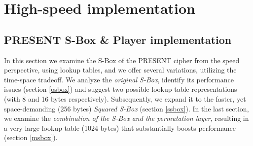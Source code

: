 \documentclass[11pt]{article}
\begin{document}
\section{High-speed implementation}

\subsection{PRESENT S-Box \& Player implementation}\label{sbox}
In this section we examine the S-Box of the PRESENT cipher from the speed perspective, using lookup tables, and we offer several variations, utilizing the time-space tradeoff. We analyze the \emph{original S-Box}, identify its performance issues (section \ref{osbox}) and suggest two possible lookup table representations (with 8 and 16 bytes respectively). Subsequently, we expand it to the faster, yet space-demanding (256 bytes) \emph{Squared S-Box} (section \ref{ssbox}). In the last section, we examine the \emph{combination of the S-Box and the permutation layer}, resulting in a very large lookup table (1024 bytes) that substantially boosts performance (section \ref{msbox}).
\end{document}
